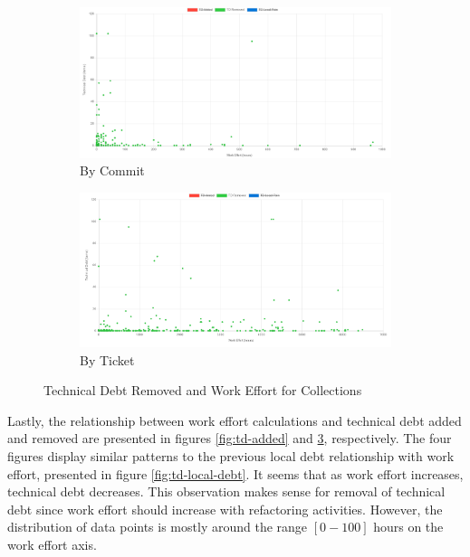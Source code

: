 \documentclass{mpaper}
\begin{document}
\begin{figure}
	\centering
	\begin{subfigure}{.45\textwidth}
		\includegraphics[width=\linewidth]{images/collections_removed_debt_commit.png}
		\caption{By Commit}
		\label{fig:td-removed-commit}
	\end{subfigure}
	\begin{subfigure}{.45\textwidth}
		\includegraphics[width=\linewidth]{images/collections_removed_debt_ticket.png}
		\caption{By Ticket}
		\label{fig:td-removed-ticket}
	\end{subfigure}
	\caption{Technical Debt Removed and Work Effort for Collections}
	\label{fig:td-removed}
\end{figure}

Lastly, the relationship between work effort calculations and technical debt
added and removed are presented in figures \ref{fig:td-added} and
\ref{fig:td-removed}, respectively. The four figures display similar patterns to
the previous local debt relationship with work effort, presented in figure
\ref{fig:td-local-debt}. It seems that as work effort increases, technical debt
decreases. This observation makes sense for removal of technical debt since work
effort should increase with refactoring activities. However, the distribution of
data points is mostly around the range $[0-100]$ hours on the work effort axis.\\
\end{document}
